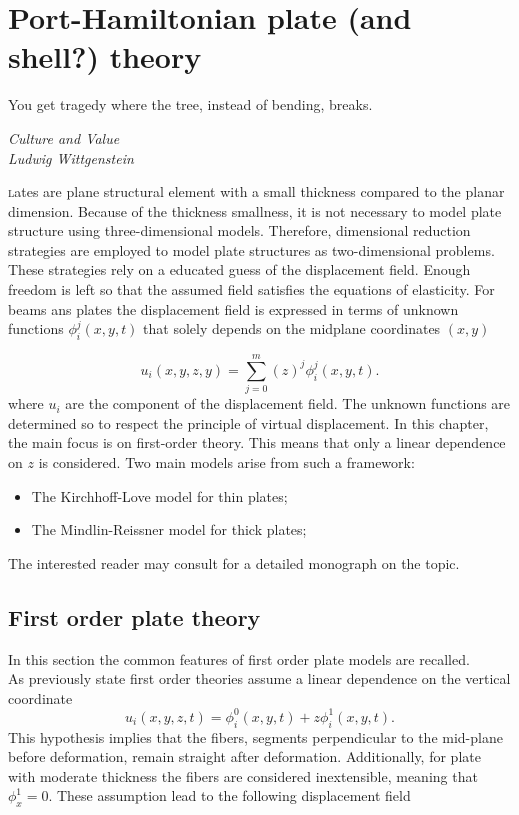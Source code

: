 \chapter{Port-Hamiltonian plate (and shell?) theory}

\epigraph{You get tragedy where the tree, instead of bending, breaks.}{\textit{Culture and Value\\
Ludwig Wittgenstein}}
\minitoc

\lettrine{\color{theme}{P}}lates are plane structural element with a small thickness compared to the planar dimension. Because of the thickness smallness, it is not necessary to model plate structure using three-dimensional models. Therefore, dimensional reduction strategies are employed to model plate structures as two-dimensional problems. These strategies rely on a educated guess of the displacement field. Enough freedom is left so that the assumed field satisfies the equations of elasticity. For beams ans plates the displacement field is expressed in terms of unknown functions $\phi_i^j(x,y,t)$ that solely depends on the midplane coordinates $(x,y)$

\[
u_i(x,y,z,y) = \sum_{j=0}^m (z)^j \phi_i^j(x,y,t).
\]
where $u_{i}$ are the component of the displacement field. The unknown functions are determined so to respect the principle of virtual displacement. In this chapter, the main focus is on first-order theory. This means that only a linear dependence on $z$ is considered. Two main models arise from such a framework: 
\begin{itemize}
	\item The Kirchhoff-Love model for thin plates;
	\item The Mindlin-Reissner model for thick plates;
\end{itemize}
The interested reader may consult \cite{reddy2006theory} for a detailed monograph on the topic.

\section{First order plate theory}
In this section  the common features of first order plate models are recalled. \\

As previously state first order theories assume a linear dependence on the vertical coordinate
\[
u_i(x,y,z,t) = \phi_i^0(x,y,t) + z \phi_i^1(x,y,t).
\]
This hypothesis implies that the fibers, segments perpendicular to the mid-plane before deformation, remain straight after deformation. Additionally, for plate with moderate thickness the fibers are considered inextensible, meaning that $\phi_x^1 = 0$. These assumption lead to the following displacement field

